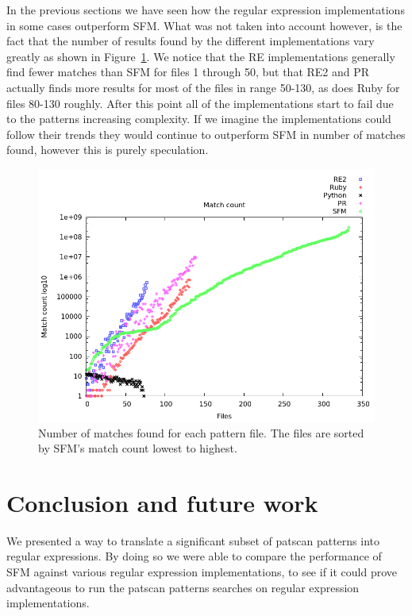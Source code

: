 \documentclass[12pt]{article}
\theoremstyle{definition}
\begin{document}
In the previous sections we have seen how the regular expression implementations in some cases outperform SFM. What was not taken into account however, is the fact that the number of results found by the different implementations vary greatly as shown in Figure~\ref{graph:match_time}. 
We notice that the RE implementations generally find fewer matches than SFM for files 1 through 50, but that RE2 and PR actually finds more results for most of the files in range 50-130, as does Ruby for files 80-130 roughly. 
After this point all of the implementations start to fail due to the patterns increasing complexity. If we imagine the implementations could follow their trends they would continue to outperform SFM in number of matches found, however this is purely speculation.

\begin{figure}[H]
	\begin{center}
		\includegraphics[scale=0.55]{graphs/match_count.png}	
	\end{center}
	\caption{Number of matches found for each pattern file. The files are sorted by SFM's match count lowest to highest.}
	\label{graph:match_time}
\end{figure}

\section{Conclusion and future work}

We presented a way to translate a significant subset of patscan patterns into regular expressions. By doing so we were able to compare the performance of SFM against various regular expression implementations, to see if it could prove advantageous to run the patscan patterns searches on regular expression implementations.
\end{document}
